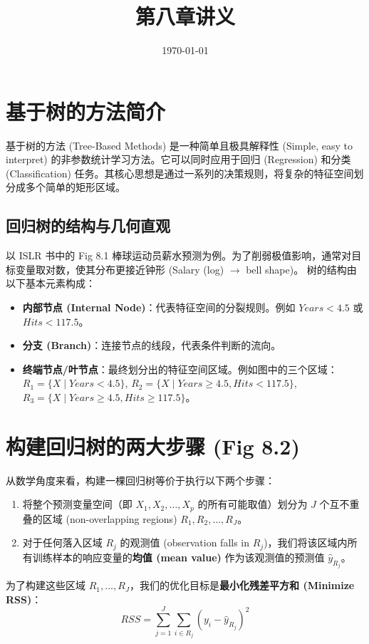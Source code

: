 \documentclass[UTF8]{ctexart}
\title{第八章讲义 }
\author{}
\date{\today}
\numberwithin{equation}{section}
\begin{document}
\maketitle

\section{基于树的方法简介}
基于树的方法 (Tree-Based Methods) 是一种简单且极具解释性 (Simple, easy to interpret) 的非参数统计学习方法。它可以同时应用于回归 (Regression) 和分类 (Classification) 任务。其核心思想是通过一系列的决策规则，将复杂的特征空间划分成多个简单的矩形区域。

\subsection{回归树的结构与几何直观}
以 ISLR 书中的 Fig 8.1 棒球运动员薪水预测为例。为了削弱极值影响，通常对目标变量取对数，使其分布更接近钟形 (Salary (log) $\rightarrow$ bell shape)。
树的结构由以下基本元素构成：
\begin{itemize}
    \item \textbf{内部节点 (Internal Node)}：代表特征空间的分裂规则。例如 $Years < 4.5$ 或 $Hits < 117.5$。
    \item \textbf{分支 (Branch)}：连接节点的线段，代表条件判断的流向。
    \item \textbf{终端节点/叶节点}：最终划分出的特征空间区域。例如图中的三个区域：
    $R_1 = \{X \mid Years < 4.5\}$, $R_2 = \{X \mid Years \ge 4.5, Hits < 117.5\}$, $R_3 = \{X \mid Years \ge 4.5, Hits \ge 117.5\}$。
\end{itemize}

\section{构建回归树的两大步骤 (Fig 8.2)}
从数学角度来看，构建一棵回归树等价于执行以下两个步骤：
\begin{enumerate}
    \item 将整个预测变量空间（即 $X_1, X_2, \dots, X_p$ 的所有可能取值）划分为 $J$ 个互不重叠的区域 (non-overlapping regions) $R_1, R_2, \dots, R_J$。
    \item 对于任何落入区域 $R_j$ 的观测值 (observation falls in $R_j$)，我们将该区域内所有训练样本的响应变量的\textbf{均值 (mean value)} 作为该观测值的预测值 $\hat{y}_{R_j}$。
\end{enumerate}

为了构建这些区域 $R_1, \dots, R_J$，我们的优化目标是\textbf{最小化残差平方和 (Minimize RSS)}：
\begin{equation}
RSS = \sum_{j=1}^J \sum_{i \in R_j} (y_i - \hat{y}_{R_j})^2
\label{eq:rss_total}
\end{equation}
\end{document}
